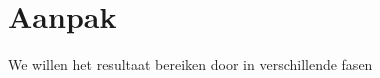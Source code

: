 \section{Aanpak}
\label{aanpak}

We willen het resultaat bereiken door in verschillende fasen 







